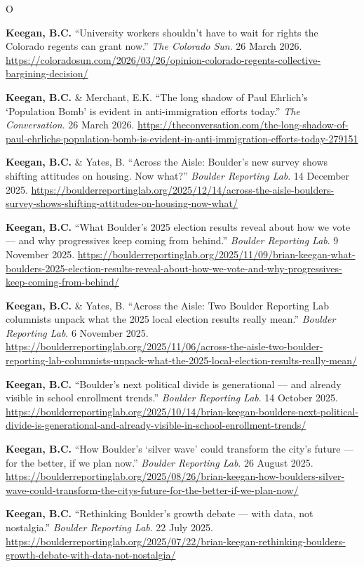 \documentclass{cv}
\begin{document}
\begin{entries}{O}
		\item \textbf{Keegan, B.C.} ``University workers shouldn't have to wait for rights the Colorado regents can grant now.'' \textit{The Colorado Sun}. 26 March 2026. \url{https://coloradosun.com/2026/03/26/opinion-colorado-regents-collective-bargining-decision/}
		\item \textbf{Keegan, B.C.} \& Merchant, E.K. ``The long shadow of Paul Ehrlich's `Population Bomb' is evident in anti-immigration efforts today.'' \textit{The Conversation}. 26 March 2026. \url{https://theconversation.com/the-long-shadow-of-paul-ehrlichs-population-bomb-is-evident-in-anti-immigration-efforts-today-279151}
		\item \textbf{Keegan, B.C.} \& Yates, B. ``Across the Aisle: Boulder's new survey shows shifting attitudes on housing. Now what?'' \textit{Boulder Reporting Lab}. 14 December 2025. \url{https://boulderreportinglab.org/2025/12/14/across-the-aisle-boulders-survey-shows-shifting-attitudes-on-housing-now-what/}
		\item \textbf{Keegan, B.C.} ``What Boulder's 2025 election results reveal about how we vote --- and why progressives keep coming from behind.'' \textit{Boulder Reporting Lab}. 9 November 2025. \url{https://boulderreportinglab.org/2025/11/09/brian-keegan-what-boulders-2025-election-results-reveal-about-how-we-vote-and-why-progressives-keep-coming-from-behind/}
		\item \textbf{Keegan, B.C.} \& Yates, B. ``Across the Aisle: Two Boulder Reporting Lab columnists unpack what the 2025 local election results really mean.'' \textit{Boulder Reporting Lab}. 6 November 2025. \url{https://boulderreportinglab.org/2025/11/06/across-the-aisle-two-boulder-reporting-lab-columnists-unpack-what-the-2025-local-election-results-really-mean/}
		\item \textbf{Keegan, B.C.} ``Boulder's next political divide is generational --- and already visible in school enrollment trends.'' \textit{Boulder Reporting Lab}. 14 October 2025. \url{https://boulderreportinglab.org/2025/10/14/brian-keegan-boulders-next-political-divide-is-generational-and-already-visible-in-school-enrollment-trends/}
		\item \textbf{Keegan, B.C.} ``How Boulder's `silver wave' could transform the city's future --- for the better, if we plan now.'' \textit{Boulder Reporting Lab}. 26 August 2025. \url{https://boulderreportinglab.org/2025/08/26/brian-keegan-how-boulders-silver-wave-could-transform-the-citys-future-for-the-better-if-we-plan-now/}
		\item \textbf{Keegan, B.C.} ``Rethinking Boulder's growth debate --- with data, not nostalgia.'' \textit{Boulder Reporting Lab}. 22 July 2025. \url{https://boulderreportinglab.org/2025/07/22/brian-keegan-rethinking-boulders-growth-debate-with-data-not-nostalgia/}

\end{entries}
\end{document}
